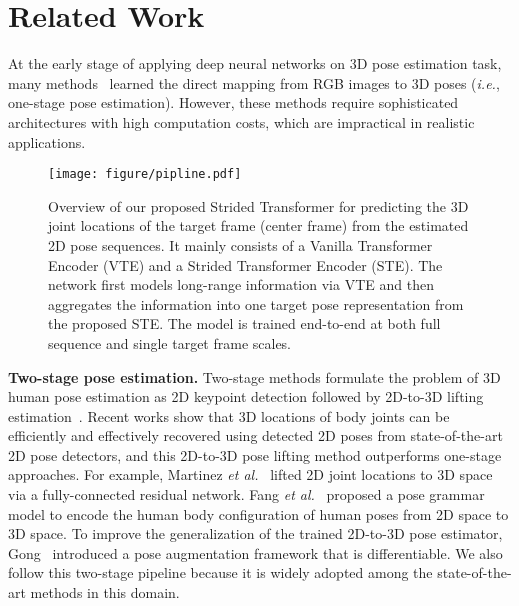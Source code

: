 \documentclass[journal]{IEEEtran}
\begin{document}
\section{Related Work}
At the early stage of applying deep neural networks on 3D pose estimation task, many methods~\cite{pavlakos2017coarse,sun2018integral,zhao2019semantic,liu2019feature} learned the direct mapping from RGB images to 3D poses (\emph{i.e.}, one-stage pose estimation).
However, these methods require sophisticated architectures with high computation costs, which are impractical in realistic applications.  

\begin{figure*}[t]
   \centering
   \texttt{[image: figure/pipline.pdf]}
   \caption
   {
      Overview of our proposed Strided Transformer for predicting the 3D joint locations of the target frame (center frame) from the estimated 2D pose sequences. 
      It mainly consists of a Vanilla Transformer Encoder (VTE) and a Strided Transformer Encoder (STE). 
      The network first models long-range information via VTE and then aggregates the information into one target pose representation from the proposed STE. 
      The model is trained end-to-end at both full sequence and single target frame scales. 
   }
   \label{fig:pipline}
\end{figure*}

\textbf{Two-stage pose estimation.}
Two-stage methods formulate the problem of 3D human pose estimation as 2D keypoint detection followed by 2D-to-3D lifting estimation~\cite{martinez2017simple,fang2018learning,xu2021graph}. 
Recent works show that 3D locations of body joints can be efficiently and effectively recovered using detected 2D poses from state-of-the-art 2D pose detectors, and this 2D-to-3D pose lifting method outperforms one-stage approaches.  
For example, 
Martinez \emph{et al.}~\cite{martinez2017simple} lifted 2D joint locations to 3D space via a fully-connected residual network. 
Fang \emph{et al.}~\cite{fang2018learning} proposed a pose grammar model to encode the human body configuration of human poses from 2D space to 3D space. 
To improve the generalization of the trained 2D-to-3D pose estimator, Gong~\cite{gong2021poseaug}
introduced a pose augmentation framework that is differentiable. 
We also follow this two-stage pipeline because it is widely adopted among the state-of-the-art methods in this domain. 
\end{document}
